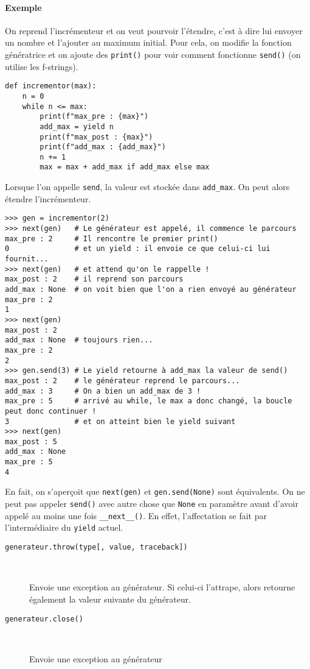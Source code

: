 \paragraph{Exemple} On reprend l'incrémenteur et on veut pourvoir l'étendre, c'est à dire lui envoyer un nombre et l'ajouter au maximum initial. Pour cela, on modifie la fonction génératrice et on ajoute des \texttt{print()} pour voir comment fonctionne \texttt{send()} (on utilise les f-strings).
\begin{verbatim}
def incrementor(max):
    n = 0
    while n <= max:
        print(f"max_pre : {max}")
        add_max = yield n
        print(f"max_post : {max}")
        print(f"add_max : {add_max}")
        n += 1
        max = max + add_max if add_max else max
\end{verbatim}
Lorsque l'on appelle \texttt{send}, la valeur est stockée dans \texttt{add_max}. On peut alors étendre l'incrémenteur.
\begin{verbatim}
>>> gen = incrementor(2)
>>> next(gen)   # Le générateur est appelé, il commence le parcours
max_pre : 2     # Il rencontre le premier print()
0               # et un yield : il envoie ce que celui-ci lui fournit...
>>> next(gen)   # et attend qu'on le rappelle !
max_post : 2    # il reprend son parcours
add_max : None  # on voit bien que l'on a rien envoyé au générateur
max_pre : 2
1
>>> next(gen)
max_post : 2
add_max : None  # toujours rien...
max_pre : 2
2
>>> gen.send(3) # Le yield retourne à add_max la valeur de send()
max_post : 2    # le générateur reprend le parcours...
add_max : 3     # On a bien un add_max de 3 !
max_pre : 5     # arrivé au while, le max a donc changé, la boucle peut donc continuer !
3               # et on atteint bien le yield suivant
>>> next(gen)
max_post : 5
add_max : None
max_pre : 5
4
\end{verbatim}
En fait, on s'aperçoit que \texttt{next(gen)} et \texttt{gen.send(None)} sont équivalents. On ne peut pas appeler \texttt{send()} avec autre chose que \texttt{None} en paramètre avant d'avoir appelé au moins une fois \texttt{__next__()}. En effet, l'affectation se fait par l'intermédiaire du \texttt{yield} actuel.

\begin{description}
    \item[\texttt{generateur.throw(type[, value, traceback])}]~

    Envoie une exception au générateur. Si celui-ci l'attrape, alors retourne également la valeur suivante du générateur.

    \item[\texttt{generateur.close()}]~

    Envoie une exception au générateur
\end{description}
